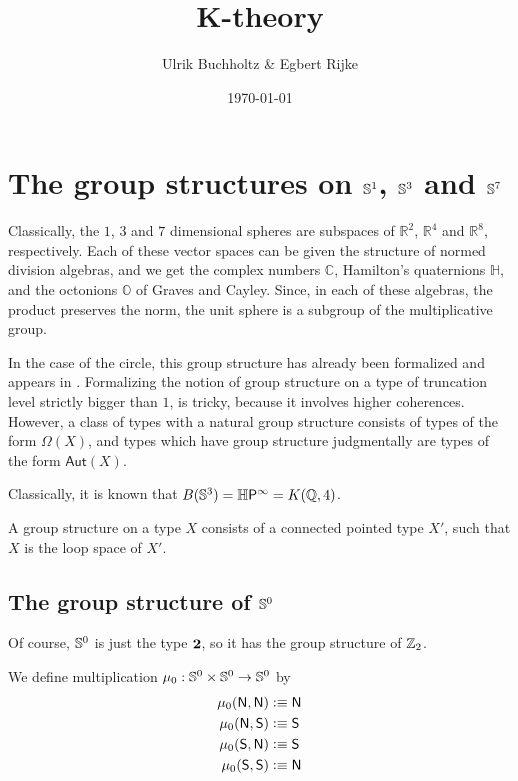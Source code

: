 \documentclass{article}
\title{K-theory}
\date{\today}
\author{Ulrik Buchholtz \& Egbert Rijke}
\begin{document}
\maketitle

\tableofcontents

\section{The group structures on $\mathbb{S}^1$, $\mathbb{S}^3$ and $\mathbb{S}^7$}
Classically, the $1$, $3$ and $7$ dimensional spheres are subspaces of $\mathbb{R}^2$,
$\mathbb{R}^4$ and $\mathbb{R}^8$, respectively. Each of these vector spaces can be
given the structure of normed division algebras, and we get the complex numbers
$\mathbb{C}$, Hamilton's quaternions $\mathbb{H}$, and the octonions $\mathbb{O}$
of Graves and Cayley. Since, in each of these algebras, the product preserves
the norm, the unit sphere is a subgroup of the multiplicative group.

In the case of the circle, this group structure has already been formalized and
appears in \cite{TheBook}. Formalizing the notion of group structure on a type
of truncation level strictly bigger than $1$, is tricky, because it involves
higher coherences. However, a class of types with a natural group structure
consists of types of the form $\Omega(X)$, and types which have group structure
judgmentally are types of the form $\mathsf{Aut}(X)$. 

Classically, it is known that $B(\mathbb{S}^3)=\mathbb{H}\mathsf{P}^\infty=K(\mathbb{Q},4)$. 

\begin{defn}
A group structure on a type $X$ consists of a connected pointed type $X'$, such
that $X$ is the loop space of $X'$.
\end{defn}

\subsection{The group structure of $\mathbb{S}^0$}

Of course, $\mathbb{S}^0$ is just the type $\mathbf{2}$, so it has the group structure of
$\mathbb{Z}_2$.

\begin{defn}
We define multiplication $\mu_0:\mathbb{S}^0\times\mathbb{S}^0\to\mathbb{S}^0$ by
\begin{align*}
\mu_0(\mathsf{N},\mathsf{N}) & \vcentcolon\equiv \mathsf{N} \\
\mu_0(\mathsf{N},\mathsf{S}) & \vcentcolon\equiv \mathsf{S} \\
\mu_0(\mathsf{S},\mathsf{N}) & \vcentcolon\equiv \mathsf{S} \\
\mu_0(\mathsf{S},\mathsf{S}) & \vcentcolon\equiv \mathsf{N}
\end{align*}
\end{defn}
\end{document}
